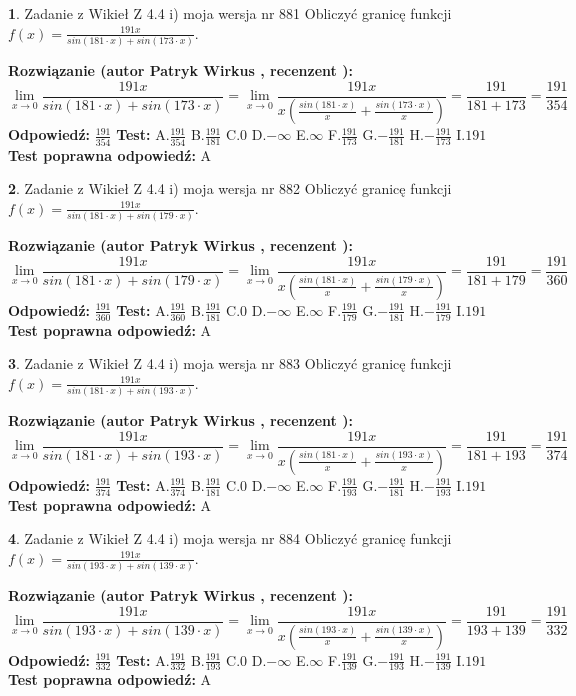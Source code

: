 \documentclass[12pt, a4paper]{article}
\theoremstyle{definition} %
\newtheorem{zad}{}
\newcommand{\zadStart}[1]{\begin{zad}#1\newline}
\newcommand{\zadStop}{\end{zad}}
\newcommand{\rozwStart}[2]{\noindent \textbf{Rozwiązanie (autor #1 , recenzent #2): }\newline}
\newcommand{\rozwStop}{\newline}
\newcommand{\odpStart}{\noindent \textbf{Odpowiedź:}\newline}
\newcommand{\odpStop}{\newline}
\newcommand{\testStart}{\noindent \textbf{Test:}\newline}
\newcommand{\testStop}{\newline}
\newcommand{\kluczStart}{\noindent \textbf{Test poprawna odpowiedź:}\newline}
\newcommand{\kluczStop}{\newline}
\begin{document}
\zadStart{Zadanie z Wikieł Z 4.4 i) moja wersja nr 881}
Obliczyć granicę funkcji $f(x)=\frac{191x}{sin(181\cdot x) +sin(173\cdot x)}$.
\zadStop
\rozwStart{Patryk Wirkus}{}
$$\lim\limits_{x\to 0}\frac{191x}{sin(181\cdot x) +sin(173\cdot x)}=\lim\limits_{x\to 0}\frac{191x}{x(\frac{sin(181\cdot x)}{x}+\frac{sin(173\cdot x)}{x})}=\frac{191}{181+173} = \frac{191}{354}$$
\rozwStop
\odpStart
$\frac{191}{354}$
\odpStop
\testStart
A.$\frac{191}{354}$
B.$\frac{191}{181}$
C.$0$
D.$-\infty$
E.$\infty$
F.$\frac{191}{173}$
G.$-\frac{191}{181}$
H.$-\frac{191}{173}$
I.$191$
\testStop
\kluczStart
A
\kluczStop



\zadStart{Zadanie z Wikieł Z 4.4 i) moja wersja nr 882}
Obliczyć granicę funkcji $f(x)=\frac{191x}{sin(181\cdot x) +sin(179\cdot x)}$.
\zadStop
\rozwStart{Patryk Wirkus}{}
$$\lim\limits_{x\to 0}\frac{191x}{sin(181\cdot x) +sin(179\cdot x)}=\lim\limits_{x\to 0}\frac{191x}{x(\frac{sin(181\cdot x)}{x}+\frac{sin(179\cdot x)}{x})}=\frac{191}{181+179} = \frac{191}{360}$$
\rozwStop
\odpStart
$\frac{191}{360}$
\odpStop
\testStart
A.$\frac{191}{360}$
B.$\frac{191}{181}$
C.$0$
D.$-\infty$
E.$\infty$
F.$\frac{191}{179}$
G.$-\frac{191}{181}$
H.$-\frac{191}{179}$
I.$191$
\testStop
\kluczStart
A
\kluczStop



\zadStart{Zadanie z Wikieł Z 4.4 i) moja wersja nr 883}
Obliczyć granicę funkcji $f(x)=\frac{191x}{sin(181\cdot x) +sin(193\cdot x)}$.
\zadStop
\rozwStart{Patryk Wirkus}{}
$$\lim\limits_{x\to 0}\frac{191x}{sin(181\cdot x) +sin(193\cdot x)}=\lim\limits_{x\to 0}\frac{191x}{x(\frac{sin(181\cdot x)}{x}+\frac{sin(193\cdot x)}{x})}=\frac{191}{181+193} = \frac{191}{374}$$
\rozwStop
\odpStart
$\frac{191}{374}$
\odpStop
\testStart
A.$\frac{191}{374}$
B.$\frac{191}{181}$
C.$0$
D.$-\infty$
E.$\infty$
F.$\frac{191}{193}$
G.$-\frac{191}{181}$
H.$-\frac{191}{193}$
I.$191$
\testStop
\kluczStart
A
\kluczStop



\zadStart{Zadanie z Wikieł Z 4.4 i) moja wersja nr 884}
Obliczyć granicę funkcji $f(x)=\frac{191x}{sin(193\cdot x) +sin(139\cdot x)}$.
\zadStop
\rozwStart{Patryk Wirkus}{}
$$\lim\limits_{x\to 0}\frac{191x}{sin(193\cdot x) +sin(139\cdot x)}=\lim\limits_{x\to 0}\frac{191x}{x(\frac{sin(193\cdot x)}{x}+\frac{sin(139\cdot x)}{x})}=\frac{191}{193+139} = \frac{191}{332}$$
\rozwStop
\odpStart
$\frac{191}{332}$
\odpStop
\testStart
A.$\frac{191}{332}$
B.$\frac{191}{193}$
C.$0$
D.$-\infty$
E.$\infty$
F.$\frac{191}{139}$
G.$-\frac{191}{193}$
H.$-\frac{191}{139}$
I.$191$
\testStop
\kluczStart
A
\kluczStop
\end{document}
